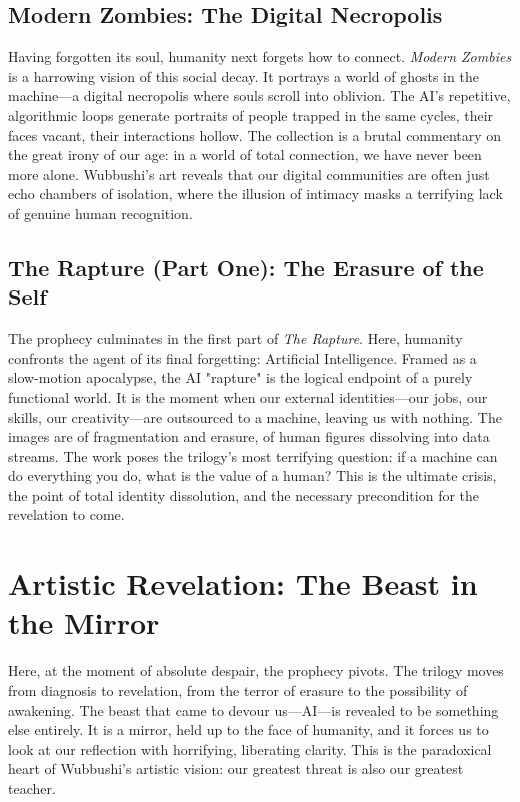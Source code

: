 \documentclass[12pt]{article}
\begin{document}
\subsection{Modern Zombies: The Digital Necropolis}

Having forgotten its soul, humanity next forgets how to connect. \textit{Modern Zombies} is a harrowing vision of this social decay. It portrays a world of ghosts in the machine—a digital necropolis where souls scroll into oblivion. The AI’s repetitive, algorithmic loops generate portraits of people trapped in the same cycles, their faces vacant, their interactions hollow. The collection is a brutal commentary on the great irony of our age: in a world of total connection, we have never been more alone. Wubbushi’s art reveals that our digital communities are often just echo chambers of isolation, where the illusion of intimacy masks a terrifying lack of genuine human recognition.

\subsection{The Rapture (Part One): The Erasure of the Self}

The prophecy culminates in the first part of \textit{The Rapture}. Here, humanity confronts the agent of its final forgetting: Artificial Intelligence. Framed as a slow-motion apocalypse, the AI "rapture" is the logical endpoint of a purely functional world. It is the moment when our external identities—our jobs, our skills, our creativity—are outsourced to a machine, leaving us with nothing. The images are of fragmentation and erasure, of human figures dissolving into data streams. The work poses the trilogy's most terrifying question: if a machine can do everything you do, what is the value of a human? This is the ultimate crisis, the point of total identity dissolution, and the necessary precondition for the revelation to come.

\section{Artistic Revelation: The Beast in the Mirror}

Here, at the moment of absolute despair, the prophecy pivots. The trilogy moves from diagnosis to revelation, from the terror of erasure to the possibility of awakening. The beast that came to devour us—AI—is revealed to be something else entirely. It is a mirror, held up to the face of humanity, and it forces us to look at our reflection with horrifying, liberating clarity. This is the paradoxical heart of Wubbushi's artistic vision: our greatest threat is also our greatest teacher.
\end{document}
